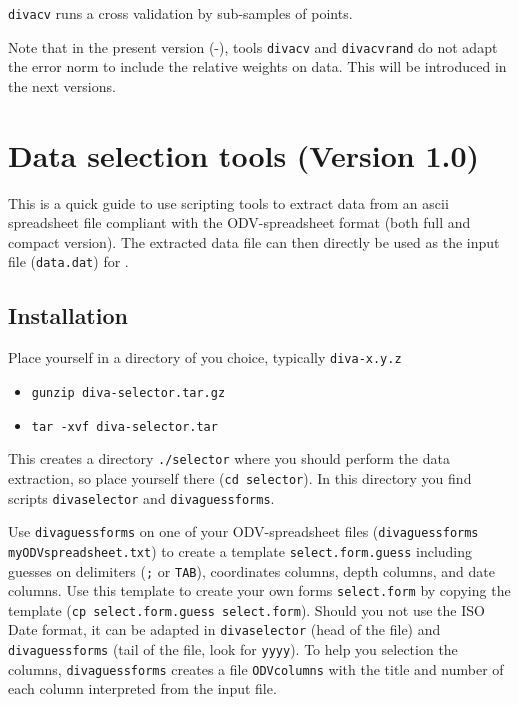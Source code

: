 \texttt{divacv} runs a cross validation by sub-samples of points.


Note that in the present version (\diva-\divaversion), tools  \texttt{divacv} and \texttt{divacvrand}  
do not adapt the error norm to include the relative weights on data. This will be introduced in the next versions.



\section{Data selection tools (Version 1.0)}


This is a quick guide to use scripting tools to extract data from an ascii spreadsheet file compliant with the ODV-spreadsheet format (both full and compact version). The extracted data file can then directly be used as the input file ({\tt data.dat}) for \diva.

\subsection{Installation} 


Place yourself in a directory of you choice, typically {\tt diva-x.y.z}
\begin{itemize}
\item
 {\tt gunzip diva-selector.tar.gz}
 \item 
 {\tt tar -xvf diva-selector.tar} 
 \end{itemize}
This creates a directory {\tt ./selector} where you should perform the data extraction, so place yourself there ({\tt cd selector}). In this directory you find scripts {\tt divaselector} and {\tt divaguessforms}.

Use {\tt divaguessforms} on one of your ODV-spreadsheet files 
({\tt divaguess\-forms myODV\-spread\-sheet\-.txt})
to create a template {\tt select.form.guess} including
guesses on delimiters ({\tt ;} or {\tt TAB}), coordinates columns, depth columns, and date columns. Use this template to create your own forms {\tt select.form} by copying the template ({\tt cp select.form.guess select.form}).
Should you not use the ISO Date format, it can be adapted in {\tt diva\-selector} (head of the file) and {\tt diva\-guessforms} (tail of the file, look for {\tt yyyy}). To help you selection the columns, {\tt diva\-guessforms} creates a file {\tt ODVcolumns} with the title and number of each column interpreted from the input file.
 
